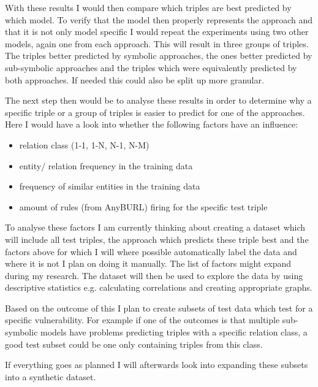 \documentclass[a4paper]{scrartcl}
\begin{document}
With these results I would then compare which triples are best predicted by which model. To verify that the model then properly represents the approach and that it is not only model specific I would repeat the experiments using two other models, again one from each approach.
This will result in three groups of triples. The triples better predicted by symbolic approaches, the ones better predicted by sub-symbolic approaches and the triples which were equivalently predicted by both approaches. If needed this could also be split up more granular.

The next step then would be to analyse these results in order to determine why a specific triple or a group of triples is easier to predict for one of the approaches. Here I would have a look into whether the following factors have an influence: 
\begin{itemize}
\item relation class (1-1, 1-N, N-1, N-M)
\item entity/ relation frequency in the training data
\item frequency of similar entities in the training data
\item amount of rules (from AnyBURL) firing for the specific test triple
\end{itemize}
To analyse these factors I am currently thinking about creating a dataset which will include all test triples, the approach which predicts these triple best and the factors above for which I will where possible automatically label the data and where it is not I plan on doing it manually. The list of factors might expand during my research. The dataset will then be used to explore the data by using  descriptive statistics e.g. calculating correlations and creating appropriate graphs. 
 
Based on the outcome of this I plan to create subsets of test data which test for a specific vulnerability. For example if one of the outcomes is that multiple sub-symbolic models have problems predicting triples with a specific relation class, a good test subset could be one only containing triples from this class.

If everything goes as planned I will afterwards look into expanding these subsets into a synthetic dataset. \\

\newpage


\end{document}
